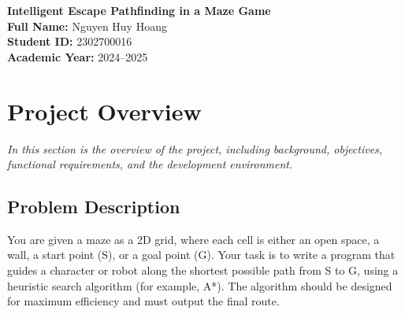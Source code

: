 \documentclass[a4paper,12pt]{article}
\renewcommand{\contentsname}{Table of Contents}
\begin{document}
\onehalfspacing  %

\begin{titlepage}
  \thispagestyle{empty}
  \vspace*{5cm}
  \begin{center}
    {\LARGE\bfseries Intelligent Escape Pathfinding in a Maze Game}\\[2em]
    {\large\bfseries Full Name:} Nguyen Huy Hoang\\[0.5em]
    {\large\bfseries Student ID:} 2302700016\\[0.5em]
    {\large\bfseries Academic Year:} 2024--2025
  \end{center}
\end{titlepage}

\newpage

\begin{abstract}
This report presents an intelligent pathfinding solution for escaping a maze.
We describe the problem statement, algorithm selection with heuristic optimization,
and system architecture using multi-threading for real-time visualization.
\end{abstract}

\newpage

\markboth{\contentsname}{}
\tableofcontents
\thispagestyle{fancy}

\newpage

\section{Project Overview}
\textit{In this section is the overview of the project, including background, objectives, functional requirements, and the development environment.}

\subsection*{Problem Description}
You are given a maze as a 2D grid, where each cell is either an open space, a wall, a start point (S), or a goal point (G). Your task is to write a program that guides a character or robot along the shortest possible path from S to G, using a heuristic search algorithm (for example, A*). The algorithm should be designed for maximum efficiency and must output the final route.
\end{document}

